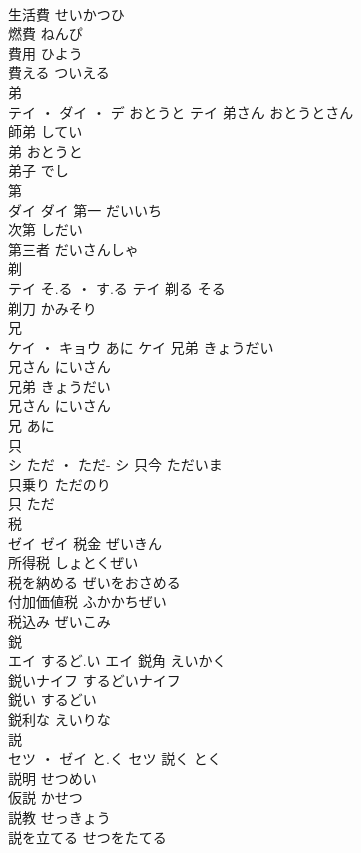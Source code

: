 \documentclass[8pt]{extreport}
\begin{document}
\begin{CJK}{UTF8}{min}
\\	生活費	せいかつひ	
\\	燃費	ねんぴ	
\\	費用	ひよう	
\\	費える	ついえる	
\\	弟	
\\	テイ ・ ダイ ・ デ	おとうと	テイ	弟さん	おとうとさん	
\\	師弟	してい	
\\	弟	おとうと	
\\	弟子	でし	
\\	第	
\\	ダイ		ダイ	第一	だいいち	
\\	次第	しだい	
\\	第三者	だいさんしゃ	
\\	剃	
\\	テイ	そ.る ・ す.る	テイ	剃る	そる	
\\	剃刀	かみそり	
\\	兄	
\\	ケイ ・ キョウ	あに	ケイ	兄弟	きょうだい	
\\	兄さん	にいさん	
\\	兄弟	きょうだい	
\\	兄さん	にいさん	
\\	兄	あに	
\\	只	
\\	シ	ただ ・ ただ-	シ	只今	ただいま	
\\	只乗り	ただのり	
\\	只	ただ	
\\	税	
\\	ゼイ		ゼイ	税金	ぜいきん	
\\	所得税	しょとくぜい	
\\	税を納める	ぜいをおさめる	
\\	付加価値税	ふかかちぜい	
\\	税込み	ぜいこみ	
\\	鋭	
\\	エイ	するど.い	エイ	鋭角	えいかく	
\\	鋭いナイフ	するどいナイフ	
\\	鋭い	するどい	
\\	鋭利な	えいりな	
\\	説	
\\	セツ ・ ゼイ	と.く	セツ	説く	とく	
\\	説明	せつめい	
\\	仮説	かせつ	
\\	説教	せっきょう	
\\	説を立てる	せつをたてる	

\end{CJK}
\end{document}
